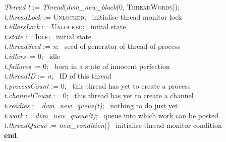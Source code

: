 \begin{tabbing}
\indents
{}
\vb\>\>\emph{Thread} \emph{t} := \emph{Thread}(\emph{dvm\_new\_block}(0, \textsc{ThreadWords})); \\
\vb\>\>\emph{t.threadLock} := \textsc{Unlocked};
   \>\>\>\>\>\>\>\>\>\> \rmk\ initialise thread monitor lock\\
\vb\>\>\emph{t.idlersLock} := \textsc{Unlocked};
   \>\>\>\>\>\>\>\>\>\> \rmk\ initial state\\
\vb\>\>\emph{t.state} := \textsc{Idle};
   \>\>\>\>\>\>\>\>\>\> \rmk\ initial state\\
\vb\>\>\emph{t.threadSeed} := \emph{n};
   \>\>\>\>\>\>\>\>\>\> \rmk\ seed of generator of thread-of-process\\
\vb\>\>\emph{t.idlers} := 0;
   \>\>\>\>\>\>\>\>\>\> \rmk\ idle\\
\vb\>\>\emph{t.failures} := 0;
   \>\>\>\>\>\>\>\>\>\> \rmk\ born in a state of innocent perfection\\
\vb\>\>\emph{t.threadID} := \emph{n};
   \>\>\>\>\>\>\>\>\>\> \rmk\ ID of this thread\\
\vb\>\>\emph{t.processCount} := 0;
   \>\>\>\>\>\>\>\>\>\> \rmk\ this thread has yet to create a process\\
\vb\>\>\emph{t.channelCount} := 0;
   \>\>\>\>\>\>\>\>\>\> \rmk\ this thread has yet to create a channel\\
\vb\>\>\emph{t.readies} := \emph{dvm\_new\_queue(t)};
   \>\>\>\>\>\>\>\>\>\> \rmk\ nothing to do just yet\\
\vb\>\>\emph{t.work} := \emph{dvm\_new\_queue(t)};
   \>\>\>\>\>\>\>\>\>\> \rmk\ queue into which work can be posted\\
\vb\>\>\emph{t.threadQueue} := \emph{new\_condition}()
   \>\>\>\>\>\>\>\>\>\> \rmk\ initialise thread monitor condition\\
\vb\>\textbf{end}.
\end{tabbing}

